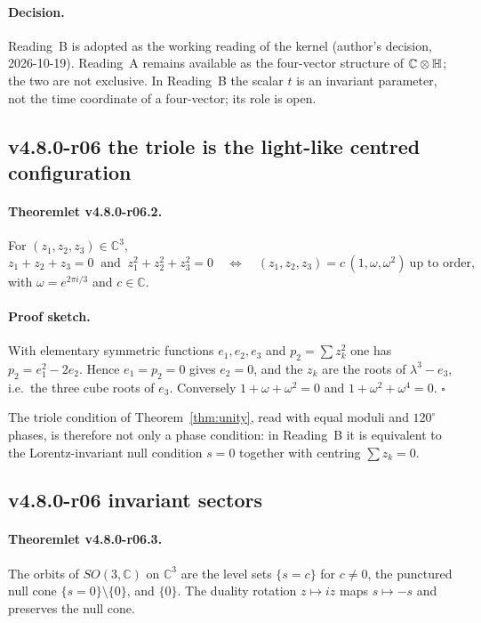 \paragraph{Decision.}
Reading~B is adopted as the working reading of the kernel (author's decision, 2026-10-19).
Reading~A remains available as the four-vector structure of \(\mathbb C\otimes\mathbb{H}\); the two
are not exclusive.  In Reading~B the scalar \(t\) is an invariant parameter, not the time
coordinate of a four-vector; its role is open.

\subsection*{v4.8.0-r06 the triole is the light-like centred configuration}
\label{subsec:v480-r06-triole-lemma}

\paragraph{Theoremlet v4.8.0-r06.2.}
For \((z_1,z_2,z_3)\in\mathbb C^3\),
\[
z_1+z_2+z_3=0\ \text{ and }\ z_1^2+z_2^2+z_3^2=0
\quad\Longleftrightarrow\quad
(z_1,z_2,z_3)=c\,(1,\omega,\omega^2)\ \text{up to order},
\]
with \(\omega=e^{2\pi i/3}\) and \(c\in\mathbb C\).

\paragraph{Proof sketch.}
With elementary symmetric functions \(e_1,e_2,e_3\) and \(p_2=\sum z_k^2\) one has
\(p_2=e_1^2-2e_2\).  Hence \(e_1=p_2=0\) gives \(e_2=0\), and the \(z_k\) are the roots of
\(\lambda^3-e_3\), i.e.\ the three cube roots of \(e_3\).  Conversely \(1+\omega+\omega^2=0\) and
\(1+\omega^2+\omega^4=0\).  \(\square\)

The triole condition of Theorem~\ref{thm:unity}, read with equal moduli and \(120^\circ\) phases,
is therefore not only a phase condition: in Reading~B it is equivalent to the Lorentz-invariant
null condition \(s=0\) together with centring \(\sum z_k=0\).

\subsection*{v4.8.0-r06 invariant sectors}
\label{subsec:v480-r06-sectors}

\paragraph{Theoremlet v4.8.0-r06.3.}
The orbits of \(SO(3,\mathbb C)\) on \(\mathbb C^3\) are the level sets \(\{s=c\}\) for \(c\neq0\),
the punctured null cone \(\{s=0\}\setminus\{0\}\), and \(\{0\}\).  The duality rotation
\(z\mapsto iz\) maps \(s\mapsto-s\) and preserves the null cone.

